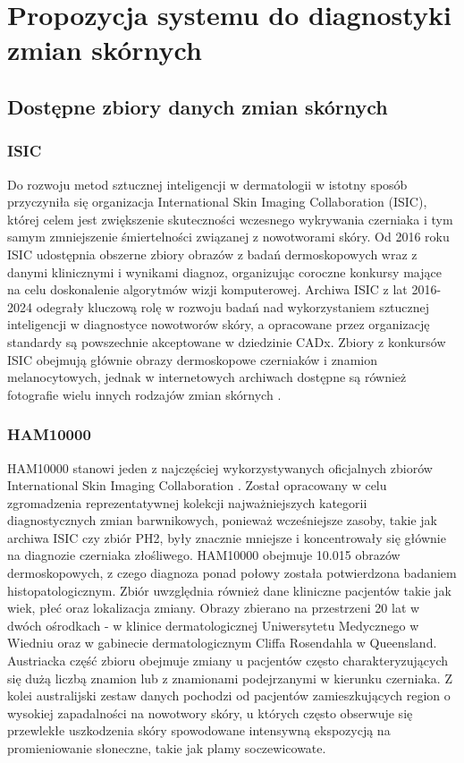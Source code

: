 
\def\filename{rozdzial3}
\chapter{Propozycja systemu do diagnostyki zmian skórnych}

\section{Dostępne zbiory danych zmian skórnych}

\subsection{ISIC}
Do rozwoju metod sztucznej inteligencji w dermatologii w istotny sposób przyczyniła się organizacja International Skin Imaging Collaboration (ISIC), której celem jest zwiększenie skuteczności wczesnego wykrywania czerniaka i tym samym zmniejszenie śmiertelności związanej z nowotworami skóry.
Od 2016 roku ISIC udostępnia obszerne zbiory obrazów z badań dermoskopowych wraz z danymi klinicznymi i wynikami diagnoz, organizując coroczne konkursy mające na celu doskonalenie algorytmów wizji komputerowej.
Archiwa ISIC z lat 2016-2024 odegrały kluczową rolę w rozwoju badań nad wykorzystaniem sztucznej inteligencji w diagnostyce nowotworów skóry, a opracowane przez organizację standardy są powszechnie akceptowane w dziedzinie CADx.
Zbiory z konkursów ISIC obejmują głównie obrazy dermoskopowe czerniaków i znamion melanocytowych, jednak w internetowych archiwach dostępne są również fotografie wielu innych rodzajów zmian skórnych \cite{Li_Koban_Schenck_Giunta_Li_Sun_2022}.

\subsection{HAM10000}
HAM10000 stanowi jeden z najczęściej wykorzystywanych oficjalnych zbiorów International Skin Imaging Collaboration \cite{Li_Koban_Schenck_Giunta_Li_Sun_2022}.
Został opracowany w celu zgromadzenia reprezentatywnej kolekcji najważniejszych kategorii diagnostycznych zmian barwnikowych, ponieważ wcześniejsze zasoby, takie jak archiwa ISIC czy zbiór PH2, były znacznie mniejsze i koncentrowały się głównie na diagnozie czerniaka złośliwego.
HAM10000 obejmuje 10.015 obrazów dermoskopowych, z czego diagnoza ponad połowy została potwierdzona badaniem histopatologicznym.
Zbiór uwzględnia również dane kliniczne pacjentów takie jak wiek, płeć oraz lokalizacja zmiany.
Obrazy zbierano na przestrzeni 20 lat w dwóch ośrodkach - w klinice dermatologicznej Uniwersytetu Medycznego w Wiedniu oraz w gabinecie dermatologicznym Cliffa Rosendahla w Queensland.
Austriacka część zbioru obejmuje zmiany u pacjentów często charakteryzujących się dużą liczbą znamion lub z znamionami podejrzanymi w kierunku czerniaka.
Z kolei australijski zestaw danych pochodzi od pacjentów zamieszkujących region o wysokiej zapadalności na nowotwory skóry, u których często obserwuje się przewlekłe uszkodzenia skóry spowodowane intensywną ekspozycją na promieniowanie słoneczne, takie jak plamy soczewicowate.

